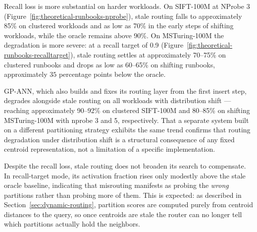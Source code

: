 \documentclass[sigconf,review,anonymous]{acmart}
\begin{document}
Recall loss is more substantial on harder workloads. On SIFT-100M at NProbe 3 (Figure~\ref{fig:theoretical-runbooks-nprobe}), stale routing falls to approximately 85\% on clustered workloads and as low as 70\% in the early steps of shifting workloads, while the oracle remains above 90\%. On MSTuring-100M the degradation is more severe: at a recall target of 0.9 (Figure~\ref{fig:theoretical-runbooks-recalltarget}), stale routing settles at approximately 70--75\% on clustered runbooks and drops as low as 60--65\% on shifting runbooks, approximately $35$ percentage points below the oracle.


GP-ANN, which also builds and fixes its routing layer from the first insert step, degrades alongside stale routing on all workloads with distribution shift — reaching approximately 90--92\% on clustered SIFT-100M and 80--85\% on shifting MSTuring-100M with nprobe 3 and 5, respectively. That a separate system built on a different partitioning strategy exhibits the same trend confirms that routing degradation under distribution shift is a structural consequence of any fixed centroid representation, not a limitation of a specific implementation.


Despite the recall loss, stale routing does not broaden its search to compensate. In recall-target mode, its activation fraction rises only modestly above the stale oracle baseline, indicating that misrouting manifests as probing the \emph{wrong} partitions rather than probing more of them. This is expected: as described in Section~\ref{sec:dynamic-routing}, partition scores are computed purely from centroid distances to the query, so once centroids are stale the router can no longer tell which partitions actually hold the neighbors.
\end{document}
